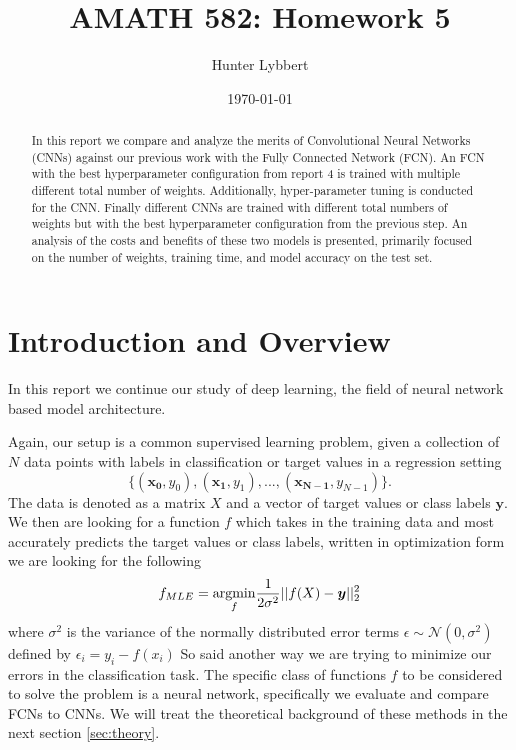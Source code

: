 \documentclass[11pt]{amsart}
\title{AMATH 582: Homework 5}
\author{Hunter Lybbert} %
\date{\today} %
\begin{document}
\maketitle

\begin{abstract}
    In this report we compare and analyze the merits of Convolutional Neural Networks (CNNs) against our previous work with the Fully Connected Network (FCN).
    An FCN with the best hyperparameter configuration from report 4 is trained with multiple different total number of weights.
    Additionally, hyper-parameter tuning is conducted for the CNN.
    Finally different CNNs are trained with different total numbers of weights but with the best hyperparameter configuration from the previous step.
    An analysis of the costs and benefits of these two models is presented, primarily focused on the number of weights, training time, and model accuracy on the test set.
\end{abstract}

\section{Introduction and Overview}\label{sec:Introduction}
In this report we continue our study of deep learning, the field of neural network based model architecture.

Again, our setup is a common supervised learning problem, given a collection of $N$ data points with labels in classification or target values in a regression setting $$\big\{(\bm{x_0}, y_0), (\bm{x_1}, y_1), ..., (\bm{x_{N-1}}, y_{N-1})\big\}.$$
The data is denoted as a matrix $X$ and a vector of target values or class labels $\bm y$.
We then are looking for a function $f$ which takes in the training data and most accurately predicts the target values or class labels, written in optimization form we are looking for the following
\begin{equation}
f_{MLE} = \underset{f}{\rm argmin } \frac 1 {2 \sigma^2}|| f(X) - \bm y ||_2^2
\label{eq:basic_ml_setup}
\end{equation}
where $\sigma^2$ is the variance of the normally distributed error terms $\epsilon \sim \mathcal N (0, \sigma^2)$ defined by $\epsilon_i = y_i - f(x_i)$
So said another way we are trying to minimize our errors in the classification task.
The specific class of functions $f$ to be considered to solve the problem is a neural network, specifically we evaluate and compare FCNs to CNNs.
We will treat the theoretical background of these methods in the next section \ref{sec:theory}.
\end{document}
